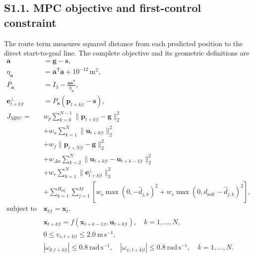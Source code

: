 \documentclass[10pt]{article}
\begin{document}
\subsection*{S1.1. MPC objective and first-control constraint}
The route term measures squared distance from each predicted position to the direct start-to-goal line. The complete objective and its geometric definitions are
\begin{equation}
\begin{aligned}
\mathbf{a}&=\mathbf{g}-\mathbf{s},\\
\eta_{\mathbf a}&=\mathbf a^{\mathsf T}\mathbf a+10^{-12}\,\mathrm m^2,\\
P_{\mathbf a}&=I_3-\frac{\mathbf a\mathbf a^{\mathsf T}}{\eta_{\mathbf a}},\\
\mathbf{e}_{t+k|t}^{\perp}&=P_{\mathbf a}(\mathbf{p}_{t+k|t}-\mathbf{s}),\\
J_{\mathrm{MPC}}={}&w_p\sum_{k=0}^{N-1}\|\mathbf{p}_{t+k|t}-\mathbf{g}\|_2^2\\
&+w_u\sum_{k=1}^{N}\|\mathbf{u}_{t+k|t}\|_2^2\\
&+w_f\|\mathbf{p}_{t+N|t}-\mathbf{g}\|_2^2\\
&+w_{\Delta u}\sum_{k=2}^{N}\|\mathbf{u}_{t+k|t}-\mathbf{u}_{t+k-1|t}\|_2^2 \\
&+w_r\sum_{k=1}^{N}\|\mathbf{e}_{t+k|t}^{\perp}\|_2^2 \\
&+\sum_{k=1}^{H_{\scriptstyle\mathrm{inj}}}\sum_{j=1}^{M}
\left[w_o\max(0,-\hat d_{j,k})^2+w_s\max(0,d_{\mathrm{soft}}-\hat d_{j,k})^2\right],\\
\text{subject to }\quad
&\mathbf{x}_{t|t}=\mathbf{x}_t,\\
&\mathbf{x}_{t+k|t}=f(\mathbf{x}_{t+k-1|t},\mathbf{u}_{t+k|t}),\quad k=1,\ldots,N,\\
&0\leq v_{c,t+k|t}\leq2.0~\mathrm{m\,s^{-1}},\\
&|\omega_{\theta,t+k|t}|\leq0.8~\mathrm{rad\,s^{-1}},\quad
|\omega_{\psi,t+k|t}|\leq0.8~\mathrm{rad\,s^{-1}},\quad k=1,\ldots,N.
\end{aligned}
\end{equation}
\end{document}
